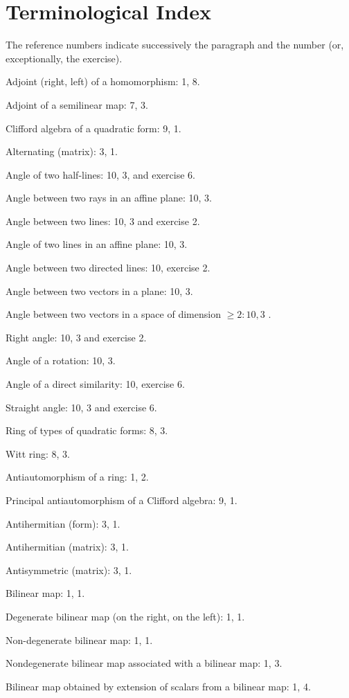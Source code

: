 \chapter*{Terminological Index}
{}

The reference numbers indicate successively the paragraph and the number (or, exceptionally, the exercise).

Adjoint (right, left) of a homomorphism: 1, 8.

Adjoint of a semilinear map: 7, 3.

Clifford algebra of a quadratic form: 9, 1.

Alternating (matrix): 3, 1.

Angle of two half-lines: 10, 3, and exercise 6.

Angle between two rays in an affine plane: 10, 3.

Angle between two lines: 10, 3 and exercise 2.

Angle of two lines in an affine plane: 10, 3.

Angle between two directed lines: 10, exercise 2.

Angle between two vectors in a plane: 10, 3.

Angle between two vectors in a space of dimension \(\geqslant 2:10,3\) .

Right angle: 10, 3 and exercise 2.

Angle of a rotation: 10, 3.

Angle of a direct similarity: 10, exercise 6.

Straight angle: 10, 3 and exercise 6.

Ring of types of quadratic forms: 8, 3.

Witt ring: 8, 3.

Antiautomorphism of a ring: 1, 2.

Principal antiautomorphism of a Clifford algebra: 9, 1.

Antihermitian (form): 3, 1.

Antihermitian (matrix): 3, 1.

Antisymmetric (matrix): 3, 1.

Bilinear map: 1, 1.

Degenerate bilinear map (on the right, on the left): 1, 1.

Non-degenerate bilinear map: 1, 1.

Nondegenerate bilinear map associated with a bilinear map: 1, 3.

Bilinear map obtained by extension of scalars from a bilinear map: 1, 4.

